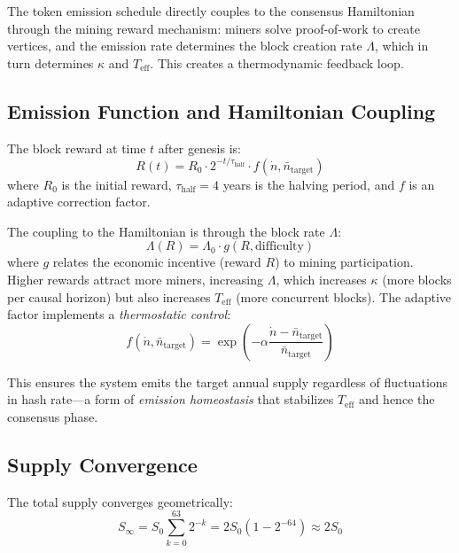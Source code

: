 \documentclass[12pt,a4paper,twocolumn]{article}
\newcommand{\kparam}{\kappa}
\newcommand{\Teff}{T_{\mathrm{eff}}}
\begin{document}
The token emission schedule directly couples to the consensus Hamiltonian through the mining reward mechanism: miners solve proof-of-work to create vertices, and the emission rate determines the block creation rate $\Lambda$, which in turn determines $\kparam$ and $\Teff$. This creates a thermodynamic feedback loop.

\subsection{Emission Function and Hamiltonian Coupling}

The block reward at time $t$ after genesis is:
\begin{equation}
R(t) = R_0 \cdot 2^{-t/\tau_{\mathrm{half}}} \cdot f(\dot{n}, \bar{n}_{\mathrm{target}})
\end{equation}
where $R_0$ is the initial reward, $\tau_{\mathrm{half}} = 4$ years is the halving period, and $f$ is an adaptive correction factor.

The coupling to the Hamiltonian is through the block rate $\Lambda$:
\begin{equation}
\Lambda(R) = \Lambda_0 \cdot g(R, \text{difficulty})
\end{equation}
where $g$ relates the economic incentive (reward $R$) to mining participation. Higher rewards attract more miners, increasing $\Lambda$, which increases $\kparam$ (more blocks per causal horizon) but also increases $\Teff$ (more concurrent blocks). The adaptive factor implements a \emph{thermostatic control}:
\begin{equation}
f(\dot{n}, \bar{n}_{\mathrm{target}}) = \exp\left(-\alpha \frac{\dot{n} - \bar{n}_{\mathrm{target}}}{\bar{n}_{\mathrm{target}}}\right)
\end{equation}

This ensures the system emits the target annual supply regardless of fluctuations in hash rate---a form of \emph{emission homeostasis} that stabilizes $\Teff$ and hence the consensus phase.

\subsection{Supply Convergence}

The total supply converges geometrically:
\begin{equation}
S_{\infty} = S_0 \sum_{k=0}^{63} 2^{-k} = 2S_0 \left(1 - 2^{-64}\right) \approx 2S_0
\end{equation}
\end{document}
